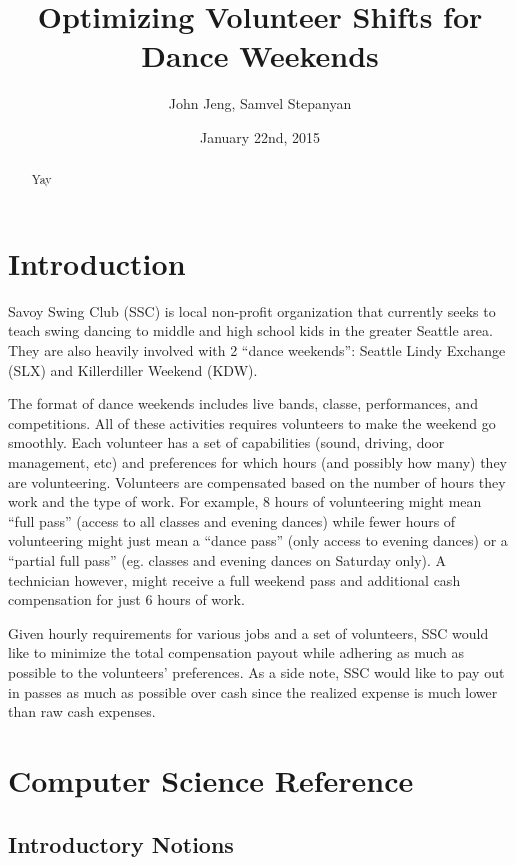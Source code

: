 \documentclass[12pt]{article}
\title{Optimizing Volunteer Shifts for Dance Weekends}
\author{John Jeng, Samvel Stepanyan}
\date{January 22nd, 2015}
\theoremstyle{definition}
\begin{document}
\maketitle
\begin{abstract}
	Yay 
\end{abstract}
\newpage
\tableofcontents
\newpage

\section{Introduction}

Savoy Swing Club (SSC) is local non-profit organization that currently seeks to teach swing dancing to middle and high school kids in the greater Seattle area.
They are also heavily involved with 2 “dance weekends”: Seattle Lindy Exchange (SLX) and Killerdiller Weekend (KDW).

The format of dance weekends includes live bands, classe, performances, and competitions. All of these activities requires volunteers to make the weekend go smoothly.
Each volunteer has a set of capabilities (sound, driving, door management, etc) and preferences for which hours (and possibly how many) they are volunteering.
Volunteers are compensated based on the number of hours they work and the type of work.
For example, 8 hours of volunteering might mean “full pass” (access to all classes and evening dances) while fewer hours of volunteering might just mean a “dance pass” (only access to evening dances) or a “partial full pass” (eg. classes and evening dances on Saturday only).
A technician however, might receive a full weekend pass and additional cash compensation for just 6 hours of work.

Given hourly requirements for various jobs and a set of volunteers, SSC would like to minimize the total compensation payout while adhering as much as possible to the volunteers’ preferences. As a side note, SSC would like to pay out in passes as much as possible over cash since the realized expense is much lower than raw cash expenses.

\section{Computer Science Reference}


\subsection{Introductory Notions}
\end{document}
